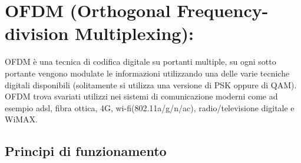 \chapter{OFDM (Orthogonal Frequency-division Multiplexing): }
OFDM è una tecnica di codifica digitale su portanti multiple, su ogni sotto portante vengono modulate le informazioni utilizzando una delle varie tecniche digitali disponibili (solitamente si utilizza una versione di PSK oppure di QAM). OFDM trova svariati utilizzi nei sistemi di comunicazione moderni come ad esempio adsl, fibra ottica, 4G, wi-fi(802.11a/g/n/ac), radio/televisione digitale e WiMAX.
\cite{ofdm}
\cite{ofdm2}

\label{sec:problem}
\section{Principi di funzionamento}
